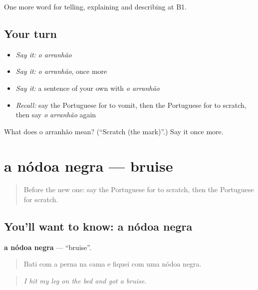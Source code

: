 \begin{grammarlens}[title={What you've built}]
One more word for telling, explaining and describing at B1.
\end{grammarlens}

\subsection*{Your turn}
\begin{itemize}
\raggedright
  \item \emph{Say it:} \emph{o arranhão}
  \item \emph{Say it:} \emph{o arranhão}, once more
  \item \emph{Say it:} a sentence of your own with \emph{o arranhão}
  \item \emph{Recall:} say the Portuguese for to vomit, then the Portuguese for to scratch, then say \emph{o arranhão} again
\end{itemize}

\begin{tcolorbox}[breakable,colback=teal!4,colframe=teal!35!black,title={Before you move on}]
What does o arranhão mean? (\textquotedblleft{}Scratch (the mark)\textquotedblright{}.) Say it once more.
\end{tcolorbox}
\section[a nódoa negra]{a nódoa negra — bruise}

\label{lesson:PT-C485-nodoa-negra}



\begin{quote}
Before the new one: say the Portuguese for to scratch, then the Portuguese for scratch.
\end{quote}

\subsection*{You'll want to know: a nódoa negra}
\textbf{a nódoa negra} — \textquotedblleft{}bruise\textquotedblright{}.

\begin{quote}
Bati com a perna na cama e fiquei com uma nódoa negra.
\end{quote}

\begin{quote}
\emph{I hit my leg on the bed and got a bruise.}
\end{quote}


